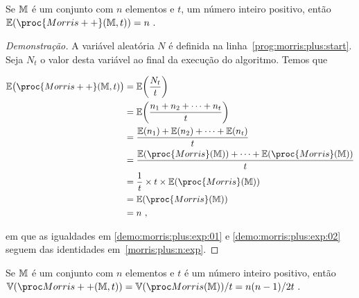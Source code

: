 \begin{theorem}
  \label{morris:plus:expected_value}
  Se $\mathbb{M}$ é um conjunto com $n$ elementos e $t$, um número inteiro positivo, então 
  $\Ebb(\proc{Morris++}(\Mbb, t)) = n \ .$
\end{theorem}

\begin{proof}[Demonstração]
  \label{demo:morris:plus}
  A variável aleatória $N$ é definida na linha~\ref{prog:morris:plus:start}. Seja $N_t$ o valor desta variável ao final 
  da execução do algoritmo. Temos que

  \begin{align}
    \Ebb\big(\proc{Morris++}(\Mbb,t)\big)
    &= \Ebb\bigg(\frac{N_t}{t} \bigg)  \nonumber\\
    &= \Ebb\bigg(\frac{n_1 + n_2 + \dots + n_t}{t} \bigg)  \nonumber\\
    &= \frac{\Ebb(n_1) + \Ebb(n_2) + \dots + \Ebb(n_t)}{t}  \nonumber\\
    &= \frac{\Ebb(\proc{Morris}(\Mbb)) + \dots + \Ebb(\proc{Morris}(\Mbb))}{t}  \label{demo:morris:plus:exp:01} \\
    &= \frac{1}{t} \times t \times \Ebb(\proc{Morris}(\Mbb)) \nonumber\\
    &= \Ebb(\proc{Morris}(\Mbb)) \nonumber\\
    &= n \ ,  \label{demo:morris:plus:exp:02}
  \end{align}

  em que as igualdades em \eqref{demo:morris:plus:exp:01} e \eqref{demo:morris:plus:exp:02} seguem das identidades 
  em~\eqref{morris:plus:n:exp}.
\end{proof}

\begin{theorem}
  \label{morris:plus:variance}
  Se $\mathbb{M}$ é um conjunto com $n$ elementos e $t$ é um número inteiro positivo, então 
  $\Vbb(\Morrispp(\Mbb,t)) = \Vbb(\Morris(\Mbb))/t = n(n-1)/2t\ . $
\end{theorem}

